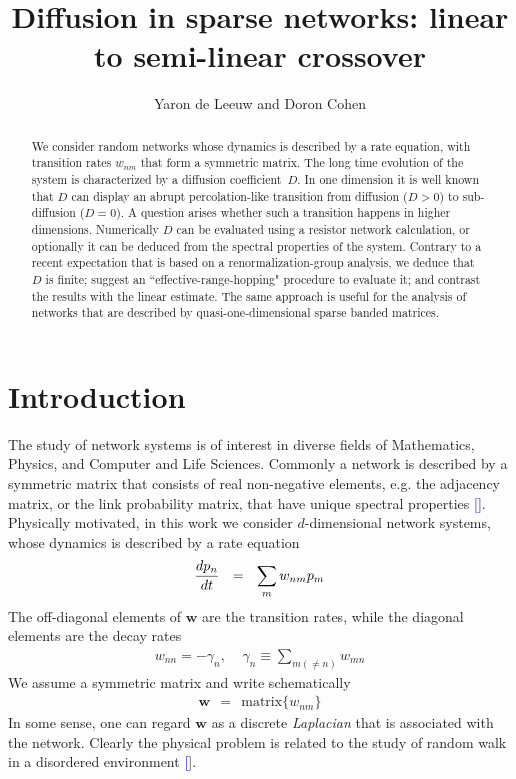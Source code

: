 \documentclass[aps,pre,floats,floatfix,twocolumn]{revtex4}
\newcommand{\mylabel}[1]{\label{#1}}
\newcommand{\beq}{\begin{eqnarray}}
\newcommand{\eeq}{\end{eqnarray}}
\newcommand{\be}[1]{\begin{eqnarray}\ifthenelse{#1=-1}
{\nonumber}{\ifthenelse{#1=0}{}{\mylabel{e#1}}}}
\newcommand{\rmrk}[1]{#1}
\renewcommand{\cite}[1]{\textcolor{blue}{[\onlinecite{#1}}]} %
\begin{document}
\title{Diffusion in sparse networks: linear to semi-linear crossover}

\author{Yaron de Leeuw and Doron Cohen}


\begin{abstract}
We consider random networks whose dynamics is
described by a rate equation, with transition rates $w_{nm}$
that form a symmetric matrix. The long time evolution
of the system is characterized by a diffusion coefficient~$D$.
In one dimension it is well known that $D$ can display an abrupt
percolation-like transition from diffusion (${D>0}$)
to sub-diffusion (${D=0}$). A question arises whether
such a transition happens in higher dimensions.
Numerically $D$ can be evaluated using a resistor network
calculation, or optionally it can be deduced from 
the spectral properties of the system. Contrary to a recent 
expectation that is based on a renormalization-group analysis, 
we deduce that $D$ is finite; 
suggest an ``effective-range-hopping" procedure to evaluate it;
and contrast the results with the linear estimate.
The same approach is useful for the analysis of 
networks that are described by quasi-one-dimensional  
sparse banded matrices. 
\end{abstract}


\maketitle


\section{Introduction}

The study of network systems is of interest in 
diverse fields of Mathematics, Physics, and Computer and Life Sciences. 
\rmrk{Commonly a network is described} by a symmetric matrix 
that consists of real non-negative elements, e.g. the adjacency matrix, 
or the link probability matrix, 
that have unique spectral properties \cite{dorogovtsev,bradde}. 
%  
Physically motivated, in this work we consider $d$-dimensional 
network systems, whose dynamics is described by a rate equation
%
\be{1}
\frac{dp_n}{dt} \ \ =  \ \ \sum_m w_{nm} p_m 
\eeq
%
The off-diagonal elements of $\bm{w}$ 
are the transition rates, while the diagonal 
elements are the decay rates 
%
\beq
w_{nn} =-\gamma_n, 
\ \ \ \ \  \gamma_n\equiv \sum_{m (\neq n)} w_{mn}  
\eeq
%
We assume a symmetric matrix and write schematically
%
\beq
\bm{w} \ \ = \ \ \text{matrix}\{w_{nm}\}
\eeq
%
\rmrk{In some sense, one can regard $\bm{w}$ as 
a discrete {\em Laplacian} that is associated with the network.}
Clearly the physical problem is related to the study 
of random walk in a disordered environment \cite{bouch,Montroll,Kaya}.
\end{document}
